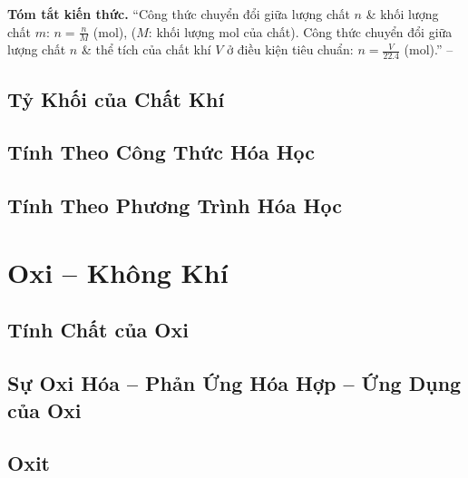 \documentclass{article}
\numberwithin{equation}{section}
\begin{document}
\noindent\textbf{Tóm tắt kiến thức.} ``Công thức chuyển đổi giữa lượng chất $n$ \& khối lượng chất $m$: $n = \frac{n}{M}$ (mol), ($M$: khối lượng mol của chất). Công thức chuyển đổi giữa lượng chất $n$ \& thể tích của chất khí $V$ ở điều kiện tiêu chuẩn: $n = \frac{V}{22.4}$ (mol).'' -- \cite[p. 67]{SGK_Hoa_Hoc_8}


\subsection{Tỷ Khối của Chất Khí}


\subsection{Tính Theo Công Thức Hóa Học}


\subsection{Tính Theo Phương Trình Hóa Học}


\section{Oxi -- Không Khí}

\subsection{Tính Chất của Oxi}


\subsection{Sự Oxi Hóa -- Phản Ứng Hóa Hợp -- Ứng Dụng của Oxi}


\subsection{Oxit}
\end{document}
